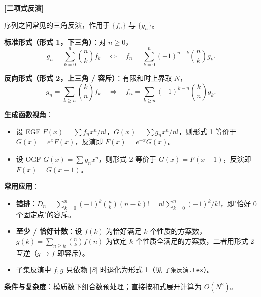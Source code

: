 \textbf{[二项式反演]}

序列之间常见的三角反演，作用于 $\{f_n\}$ 与 $\{g_n\}$。

\textbf{标准形式（形式 1，下三角）}：对 $n\ge 0$，
\[
g_n = \sum_{k=0}^{n} \binom{n}{k} f_k
\quad\Longleftrightarrow\quad
f_n = \sum_{k=0}^{n} (-1)^{n-k} \binom{n}{k} g_k.
\]

\textbf{反向形式（形式 2，上三角 / 容斥）}：有限和时上界取 $N$，
\[
g_n = \sum_{k\ge n} \binom{k}{n} f_k
\quad\Longleftrightarrow\quad
f_n = \sum_{k\ge n} (-1)^{k-n} \binom{k}{n} g_k.
\]

\textbf{生成函数视角}：
\begin{itemize}
\item 设 EGF $F(x)=\sum f_n x^n/n!$，$G(x)=\sum g_n x^n/n!$，则形式 1 等价于 $G(x)=e^x F(x)$，反演即 $F(x)=e^{-x}G(x)$。
\item 设 OGF $G(x)=\sum g_n x^n$，则形式 2 等价于 $G(x)=F(x+1)$，反演即 $F(x)=G(x-1)$。
\end{itemize}

\textbf{常用应用}：
\begin{itemize}
\item \textbf{错排}：$D_n=\sum_{k=0}^{n}(-1)^k\binom{n}{k}(n-k)!=n!\sum_{k=0}^{n}(-1)^k/k!$，即"恰好 0 个固定点"的容斥。
\item \textbf{至少 / 恰好计数}：设 $f(k)$ 为恰好满足 $k$ 个性质的方案数，$g(k)=\sum_{n\ge k}\binom{n}{k}f(n)$ 为钦定 $k$ 个性质全满足的方案数，二者用形式 2 互逆（$g\to f$ 即容斥）。
\item 子集反演中 $f,g$ 只依赖 $|S|$ 时退化为形式 1（见 \texttt{子集反演.tex}）。
\end{itemize}

\textbf{条件与复杂度}：模质数下组合数预处理；直接按和式展开计算为 $O(N^2)$。
